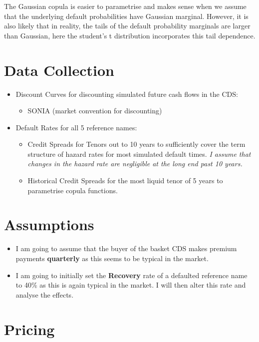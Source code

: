 \documentclass{report}
\theoremstyle{plain}
\theoremstyle{definition}
\begin{document}
The Gaussian copula is easier to parametrise and makes sense when we assume that the underlying default probabilities have Gaussian marginal. However, it is also likely that in reality, the tails of the default probability marginals are larger than Gaussian, here the student's t distribution incorporates this tail dependence.

\section{Data Collection}

\begin{itemize}
	\item Discount Curves for discounting simulated future cash flows in the CDS:
	\begin{itemize}
		\item SONIA (market convention for discounting)
	\end{itemize}
	\item Default Rates for all 5 reference names:
	\begin{itemize}
		\item Credit Spreads for Tenors out to 10 years to sufficiently cover the term structure of hazard rates for most simulated default times. \textit{I assume that changes in the hazard rate are negligible at the long end past 10 years.}
		\item Historical Credit Spreads for the most liquid tenor of 5 years to parametrise copula functions. 
	\end{itemize}	
\end{itemize}

\section{Assumptions}
\begin{itemize}
	\item I am going to assume that the buyer of the basket CDS makes premium payments \textbf{quarterly} as this seems to be typical in the market.
	\item I am going to initially set the \textbf{Recovery} rate of a defaulted reference name to 40\% as this is again typical in the market. I will then alter this rate and analyse the effects.
\end{itemize}

\section{Pricing}
\end{document}

